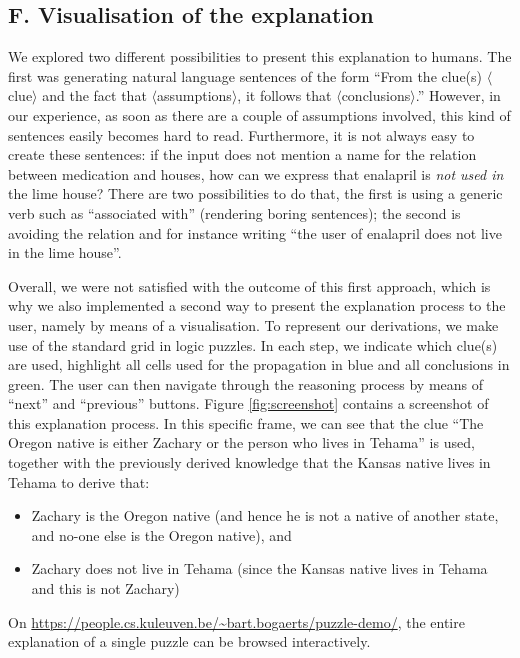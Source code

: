 \subsection{F. Visualisation of the explanation}
We explored two different possibilities to present this explanation to humans. 
The first was generating natural language sentences of the form 
``From the clue(s) $\langle$clue$\rangle$ and the fact that $\langle$assumptions$\rangle$, it follows that $\langle$conclusions$\rangle$.''
However, in our experience, as soon as there are a couple of assumptions involved, this kind of sentences easily becomes hard to read. Furthermore, it is not always easy to create these sentences: if the input does not mention a name for the relation between medication and houses, how can we express that enalapril is \emph{not used in} the lime house? 
There are two possibilities to do that, the first is using a generic verb such as ``associated with'' (rendering boring sentences); the second is avoiding the relation and for instance writing ``the user of enalapril does not live in the lime house''. 

Overall, we were not satisfied with the outcome of this first approach, which is why we also implemented a second way to present the explanation process to the user, namely by means of a visualisation. To represent our derivations, we make use of the standard grid in logic puzzles. In each step, we indicate which clue(s) are used, highlight all cells used for the propagation in blue and all conclusions in green. 
The user can then navigate through the reasoning process by means of ``next'' and ``previous'' buttons. 
Figure \ref{fig:screenshot} contains a screenshot of this explanation process. 
In this specific frame, we can see that the clue ``The Oregon native is either Zachary or the person who lives in Tehama'' is used, together with the previously derived knowledge that the Kansas native lives in Tehama to derive that:
\begin{itemize}
 \item Zachary is the Oregon native (and hence he is not a native of another state, and no-one else is the Oregon native), and
 \item Zachary does not live in Tehama (since the Kansas native lives in Tehama and this is not Zachary)
\end{itemize}
On \url{https://people.cs.kuleuven.be/~bart.bogaerts/puzzle-demo/}, the entire explanation of a single puzzle can be browsed interactively. 

